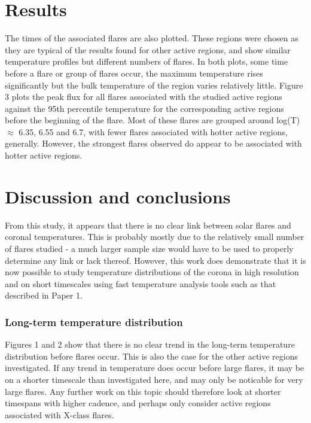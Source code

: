 \documentclass{article}
\begin{document}
\section{Results}
The times of the associated flares are also plotted.
These regions were chosen as they are typical of the results found for other active regions, and show similar temperature profiles but different numbers of flares.
In both plots, some time before a flare or group of flares occur, the maximum temperature rises significantly but the bulk temperature of the region varies relatively little.
Figure 3 plots the peak flux for all flares associated with the studied active regions against the 95th percentile temperature for the corresponding active regions before the beginning of the flare.
Most of these flares are grouped around log(T) $\approx$ 6.35, 6.55 and 6.7, with fewer flares associated with hotter active regions, generally.
However, the strongest flares observed do appear to be associated with hotter active regions.

\section{Discussion and conclusions}
From this study, it appears that there is no clear link between solar flares and coronal temperatures.
This is probably mostly due to the relatively small number of flares studied - a much larger sample size would have to be used to properly determine any link or lack thereof.
However, this work does demonstrate that it is now possible to study temperature distributions of the corona in high resolution and on short timescales using fast temperature analysis tools such as that described in Paper 1.

\subsubsection{Long-term temperature distribution}
Figures 1 and 2 show that there is no clear trend in the long-term temperature distribution before flares occur.
This is also the case for the other active regions investigated. If any trend in temperature does occur before large flares, it may be on a shorter timescale than investigated here, and may only be noticable for very large flares.
Any further work on this topic should therefore look at shorter timespans with higher cadence, and perhaps only consider active regions associated with X-class flares.
\end{document}
